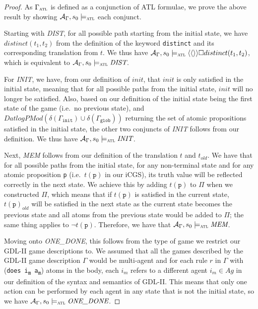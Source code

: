 \documentclass{article}
\theoremstyle{theorem}
\theoremstyle{lemma}
\theoremstyle{definition}
\theoremstyle{remark}
\begin{document}
\begin{proof}
    As $\Gamma_\textsc{atl}$ is defined as a conjunction of ATL formulae, we prove the above result by showing $\mathcal{A}_\Gamma, s_0 \models_\textsc{atl}$ each conjunct.
    \par Starting with \textit{DIST}, for all possible path starting from the initial state, we have $distinct(t_1,t_2)$ from the definition of the keyword \texttt{distinct} and its corresponding translation from $t$. We thus have $\mathcal{A}_\Gamma, s_0 \models_\textsc{atl} \langle \langle \rangle \rangle \square distinct(t_1, t_2)$, which is equivalent to $\mathcal{A}_\Gamma, s_0 \models_\textsc{atl} \textit{DIST}$.
    \par For \textit{INIT}, we have, from our definition of $init$, that $init$ is only satisfied in the initial state, meaning that for all possible paths from the initial state, $init$ will no longer be satisfied. Also, based on our definition of the initial state being the first state of the game (i.e.\ no previous state), and $DatlogPMod(\delta(\Gamma_\texttt{init}) \cup \delta(\Gamma_\texttt{glob}))$ returning the set of atomic propositions satisfied in the initial state, the other two conjuncts of \textit{INIT} follows from our definition. We thus have $\mathcal{A}_\Gamma, s_0 \models_\textsc{atl} \textit{INIT}$.
    \par Next, \textit{MEM} follows from our definition of the translation $t$ and $t_{old}$. We have that for all possible paths from the initial state, for any non-terminal state and for any atomic proposition \texttt{p} (i.e.\ $t(\texttt{p})$ in our iCGS), its truth value will be reflected correctly in the next state. We achieve this by adding $t(\texttt{p})$ to $\Pi$ when we constructed $\Pi$, which means that if $t(\texttt{p})$ is satisfied in the current state, $t(\texttt{p})_{old}$ will be satisfied in the next state as the current state becomes the previous state and all atoms from the previous state would be added to $\Pi$; the same thing applies to $\neg t(\texttt{p})$. Therefore, we have that $\mathcal{A}_\Gamma, s_0 \models_\textsc{atl} \textit{MEM}$.
    \par Moving onto \textit{ONE\_DONE}, this follows from the type of game we restrict our GDL-II game descriptions to. We assumed that all the games described by the GDL-II game description $\Gamma$ would be multi-agent and for each rule $r$ in $\Gamma$ with (\texttt{does i\textsubscript{m} a\textsubscript{m}}) atoms in the body, each $i_m$ refers to a different agent $i_m \in Ag$ in our definition of the syntax and semantics of GDL-II. This means that only one action can be performed by each agent in any state that is not the initial state, so we have $\mathcal{A}_\Gamma, s_0 \models_\textsc{atl} \textit{ONE\_DONE}$.

\end{proof}
\end{document}
